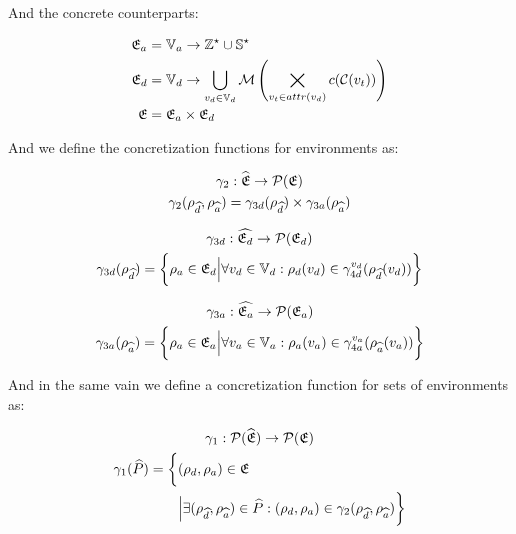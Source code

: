 And the concrete counterparts:


\begin{align}
    \mathfrak{E}_a &= \mathbb{V}_a \rightarrow \mathbb{Z}^\star \cup \mathbb{S}^\star \\
    \mathfrak{E}_d &= \mathbb{V}_d \rightarrow \bigcup_{v_d \in \mathbb{V}_d} \mathcal{M}\left(\bigtimes_{v_t \in attr(v_d)}c(\mathcal{C}(v_t))\right) \\
    \mathfrak{E} &= \mathfrak{E}_a \times \mathfrak{E}_d
\end{align}


And we define the concretization functions for environments as:


\begin{gather}
    \gamma_2 : \widehat{\mathfrak{E}} \rightarrow \mathcal{P}(\mathfrak{E})\\
    \gamma_2(\rho_{\widehat{d}}, \rho_{\widehat{a}}) = \gamma_{3d}(\rho_{\widehat{d}}) \times \gamma_{3a}(\rho_{\widehat{a}})
\end{gather}


\begin{gather}
    \gamma_{3d} : \widehat{\mathfrak{E}_d} \rightarrow \mathcal{P}(\mathfrak{E}_d)\\
    \gamma_{3d}(\rho_{\widehat{d}}) = \biggl\{ \rho_{a} \in \mathfrak{E}_d \Big| \forall v_d \in \mathbb{V}_d : \rho_d(v_d) \in \gamma^{v_d}_{4d}(\rho_{\widehat{d}}(v_d)) \biggr\}
\end{gather}


\begin{gather}
    \gamma_{3a} : \widehat{\mathfrak{E}_a} \rightarrow \mathcal{P}(\mathfrak{E}_a)\\
    \gamma_{3a}(\rho_{\widehat{a}}) = \biggl\{ \rho_{a} \in \mathfrak{E}_a \Big| \forall v_a \in \mathbb{V}_a : \rho_a(v_a) \in \gamma^{v_a}_{4a}(\rho_{\widehat{a}}(v_a)) \biggr\}
\end{gather}


And in the same vain we define a concretization function for sets of environments as:


\begin{gather}
    \gamma_1 : \mathcal{P}(\widehat{\mathfrak{E}}) \rightarrow \mathcal{P}(\mathfrak{E})\\
    \begin{split}
        \gamma_1(\widehat{P}) = \biggl\{ &(\rho_{d}, \rho_{a}) \in \mathfrak{E} \\
        &\Big| \exists (\rho_{\widehat{d}}, \rho_{\widehat{a}}) \in \widehat{P} : (\rho_{d}, \rho_{a}) \in \gamma_2(\rho_{\widehat{d}}, \rho_{\widehat{a}})\biggr\}
    \end{split}
\end{gather}

